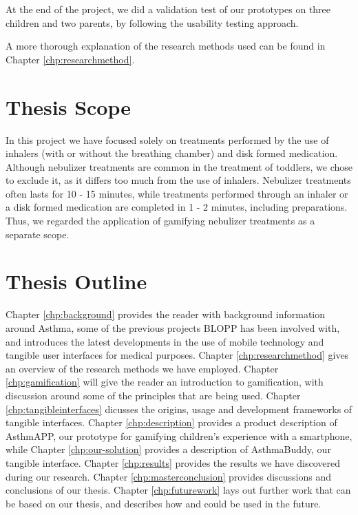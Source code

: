 At the end of the project, we did a validation test of our prototypes on three children and two parents, by following the usability testing approach. 

A more thorough explanation of the research methods used can be found in Chapter \ref{chp:researchmethod}. 


\section{Thesis Scope}
\label{sec:thesis scope}

In this project we have focused solely on treatments performed by the use of inhalers (with or without the breathing chamber) and disk formed medication. Although nebulizer treatments are common in the treatment of toddlers, we chose to exclude it, as it differs too much from the use of inhalers. Nebulizer treatments often lasts for 10 - 15 minutes, while treatments performed through an inhaler or a disk formed medication are completed in 1 - 2 minutes, including preparations. Thus, we regarded the application of gamifying nebulizer treatments as a separate scope.
 


\section{Thesis Outline}
\label{sec:thesisoutline}
Chapter \ref{chp:background} provides the reader with background information around Asthma, some of the previous projects BLOPP has been involved with, and introduces the latest developments in the use of mobile technology and tangible user interfaces for medical purposes.
Chapter \ref{chp:researchmethod} gives an overview of the research methods we have employed.  
Chapter \ref{chp:gamification} will give the reader an introduction to gamification, with discussion around some of the principles that are being used. 
Chapter \ref{chp:tangibleinterfaces} dicusses the origins, usage and development frameworks of tangible interfaces.
Chapter \ref{chp:description} provides a product description of AsthmAPP, our prototype for gamifying children's experience with a smartphone, while Chapter \ref{chp:our-solution} provides a description of AsthmaBuddy, our tangible interface.
Chapter \ref{chp:results} provides the results we have discovered during our research.
Chapter \ref{chp:masterconclusion} provides discussions and conclusions of our thesis.
Chapter \ref{chp:futurework} lays out further work that can be based on our thesis, and describes how \ab{} and \app{} could be used in the future.            
